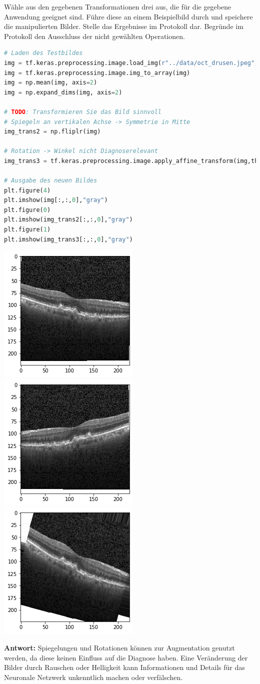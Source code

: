 \documentclass[a4paper,10pt,titlepage]{scrartcl}
\begin{document}
Wähle aus den gegebenen Transformationen drei aus, die für die gegebene Anwendung geeignet sind. Führe diese an einem Beispielbild durch und speichere die manipulierten Bilder. Stelle das Ergebnisse im Protokoll dar. Begründe im Protokoll den Ausschluss der nicht gewählten Operationen.

\begin{lstlisting}[language=python]
# Laden des Testbildes
img = tf.keras.preprocessing.image.load_img(r"../data/oct_drusen.jpeg", target_size=(224, 224))
img = tf.keras.preprocessing.image.img_to_array(img)
img = np.mean(img, axis=2)
img = np.expand_dims(img, axis=2)

# TODO: Transformieren Sie das Bild sinnvoll
# Spiegeln an vertikalen Achse -> Symmetrie in Mitte
img_trans2 = np.fliplr(img)

# Rotation -> Winkel nicht Diagnoserelevant 
img_trans3 = tf.keras.preprocessing.image.apply_affine_transform(img,theta= 15) 

# Ausgabe des neuen Bildes
plt.figure(4)
plt.imshow(img[:,:,0],"gray")
plt.figure(0)
plt.imshow(img_trans2[:,:,0],"gray")
plt.figure(1)
plt.imshow(img_trans3[:,:,0],"gray")
\end{lstlisting}

\begin{center}
    \includegraphics[width=0.2\linewidth]{Assets/prakBMT-DeepLearning-02.png}
    \includegraphics[width=0.2\linewidth]{Assets/prakBMT-DeepLearning-03.png}
    \includegraphics[width=0.2\linewidth]{Assets/prakBMT-DeepLearning-04.png}
\end{center}

\textbf{Antwort:} Spiegelungen und Rotationen können zur Augmentation genutzt werden, da diese keinen Einfluss auf die Diagnose haben. Eine Veränderung der Bilder durch Rauschen oder Helligkeit kann Informationen und Details für das Neuronale Netzwerk unkenntlich machen oder verfälschen.
\end{document}
